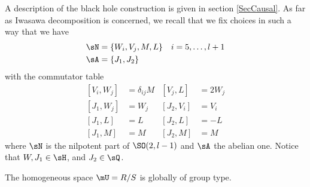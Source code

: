 A description of the black hole construction is given in section \ref{SecCausal}. As far as Iwasawa decomposition is concerned, we recall that we fix choices in such a way that we have
\begin{subequations}
\begin{align}
\sN&=\{W_i,V_j,M,L\}&\text{}i=5,\ldots, l+1\\
\sA&=\{J_1,J_2\}
\end{align}
\end{subequations}
 with the commutator table
\begin{subequations} %
\begin{align}
[V_i,W_j]&=\delta_{ij}M &[V_j,L]&=2W_j\\
[J_1,W_j]&=W_j       &[J_2,V_i]&=V_i\\
[J_1,L]&=L           &[J_2,L]&=-L\\
[J_1,M]&=M           &[J_2,M]&=M
\end{align}
\end{subequations}
  where $\sN$ is the nilpotent part of $\SO(2,l-1)$ and $\sA$ the abelian one. Notice that $W,J_{1}\in\sH$, and $J_{2}\in\sQ$.




\begin{proposition}
The homogeneous space $\mU=R/S$ is globally of group type.
\label{PropRsurSglobgroup}
\end{proposition}


